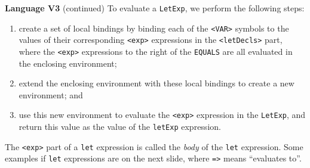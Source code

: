 \begin{minipage}[t]{\sw}
\slidenumber
\LARGE
{\bf Language V3} (continued)\exx
\Large
\emm{}\exx
\LARGE
To evaluate a \verb'LetExp', we perform the following steps:
\begin{enumerate}
\item
  create a set of local bindings
  by binding each of the \verb'<VAR>' symbols
  to the values of their corresponding \verb'<exp>' expressions
  in the \verb'<letDecls>' part,
  where the \verb'<exp>' expressions to the right
  of the \verb'EQUALS' are all evaluated
  in the enclosing environment;
\item
  extend the enclosing environment with these local bindings
  to create a new environment; and
\item
  use this new environment to evaluate the \verb'<exp>' expression
  in the \verb'LetExp', and return this value
  as the value of the \verb'letExp' expression.
\end{enumerate}
The \verb'<exp>' part of a \verb'let' expression
is called the {\em body} of the \verb'let' expression.\exx
Some examples if \verb'let' expressions are on the next slide,
where \verb'=>' means ``evaluates to''.
\end{minipage}
